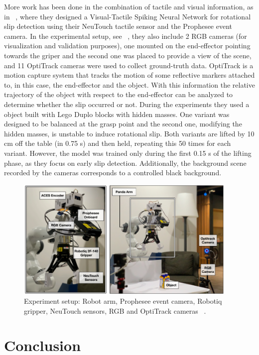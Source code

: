 More work has been done in the combination of tactile and visual information, as in ~\cite{rss2020}, where they designed a Visual-Tactile Spiking Neural Network for rotational slip detection using their NeuTouch tactile sensor and the Prophesee event camera. In the experimental setup, see ~, they also include 2 RGB cameras (for visualization and validation purposes), one mounted on the end-effector pointing towards the griper and the second one was placed to provide a view of the scene, and 11 OptiTrack cameras were used to collect ground-truth data. OptiTrack is a motion capture system that tracks the motion of some reflective markers attached to, in this case, the end-effector and the object. With this information the relative trajectory of the object with respect to the end-effector can be analyzed to determine whether the slip occurred or not. During the experiments they used a object built with Lego Duplo blocks with hidden masses. One variant was designed to be balanced at the grasp point and the second one, modifying the hidden masses, is unstable to induce rotational slip. Both variants are lifted by 10 cm off the table (in 0.75 s) and then held, repeating this 50 times for each variant. However, the model was trained only during the first 0.15 s of the lifting phase, as they focus on early slip detection. Additionally, the background scene recorded by the cameras corresponds to a controlled black background.

\begin{figure}[h]
    \centering
    \includegraphics[width=0.95\textwidth]{resources/images/rss2020}
    \caption{Experiment setup: Robot arm, Prophesee event camera, Robotiq gripper, NeuTouch sensors, RGB and OptiTrack cameras ~\cite{rss2020}.}\label{fig:rss2020}
\end{figure}

\section{Conclusion}

